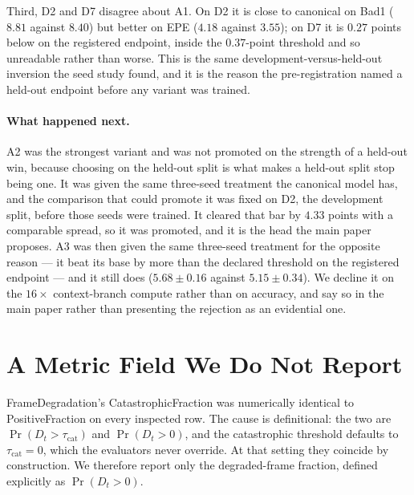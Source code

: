 \documentclass[letterpaper,10pt,conference]{ieeeconf}
\begin{document}
Third, D2 and D7 disagree about A1. On D2 it is close to canonical on
Bad1 ($8.81$ against $8.40$) but better on EPE ($4.18$ against $3.55$); on
D7 it is $0.27$ points below on the registered endpoint, inside the
$0.37$-point threshold and so unreadable rather than worse. This is the same
development-versus-held-out inversion the seed study found, and it is the
reason the pre-registration named a held-out endpoint before any variant
was trained.

\paragraph{What happened next.} A2 was the strongest variant and was not
promoted on the strength of a held-out win, because choosing on the held-out
split is what makes a held-out split stop being one. It was given the same
three-seed treatment the canonical model
has, and the comparison that could promote it was fixed on D2, the
development split, before those seeds were trained. It cleared that bar by
$4.33$ points with a comparable spread, so it was promoted, and it is the
head the main paper proposes. A3 was then given the same three-seed treatment
for the opposite reason --- it beat its base by more than the declared
threshold on the registered endpoint --- and it still does
($5.68\pm0.16$ against $5.15\pm0.34$). We decline it on the $16\times$
context-branch compute rather than on accuracy, and say so in the main
paper rather than presenting the rejection as an evidential one.

\section{A Metric Field We Do Not Report}

FrameDegradation's CatastrophicFraction was numerically identical to
PositiveFraction on every inspected row. The cause is definitional:
the two are $\Pr(D_t>\tau_{\mathrm{cat}})$ and $\Pr(D_t>0)$, and the
catastrophic threshold defaults to $\tau_{\mathrm{cat}}=0$, which the
evaluators never override. At that setting they coincide by
construction. We therefore report only the degraded-frame fraction,
defined explicitly as $\Pr(D_t>0)$.
\end{document}
